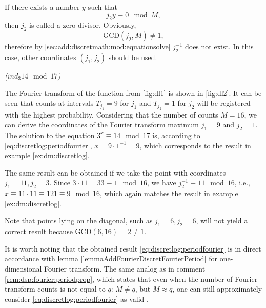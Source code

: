 \begin{remark}
If there exists a number $y$ such that 
\[
j_2 y \equiv 0 \mod M,
\]
then $j_2$ is called a zero divisor. 
Obviously, 
\[
\text{GCD}\left(j_2, M\right) \ne 1,
\]
therefore by \autoref{sec:add:discretmath:mod:equationsolve} $j_2^{-1}$ does not exist. In this case, other coordinates $(j_1, j_2)$ should be used. 
\end{remark}

\begin{example}
\emph{($ind_3{14} \mod{17}$)}


The Fourier transform of the function from \autoref{fig:dl1} is shown in \autoref{fig:dl2}. It can be seen that counts at intervals $T_{j_1} = 9$ for $j_1$ and $T_{j_2} = 1$ for $j_2$ will be registered with the highest probability. Considering that the number of counts $M=16$, we can derive the coordinates of the Fourier transform maximum $j_1 = 9$ and $j_2 = 1$. The solution to the equation $3^x \equiv 14 \mod 17$ is, according to \eqref{eq:discretlog:periodfourier}, $x = 9 \cdot 1^{-1} = 9$, which corresponds to the result in example \ref{ex:dm:discretlog}.

The same result can be obtained if we take the point with coordinates $j_1 = 11, j_2 = 3$. Since $3 \cdot 11 = 33 \equiv 1 \mod 16$, we have $j_2^{-1} \equiv 11 \mod 16$, i.e., $x \equiv 11 \cdot 11 \equiv 121 \equiv 9 \mod 16$, which again matches the result in example \ref{ex:dm:discretlog}.

Note that points lying on the diagonal, such as $j_1 = 6, j_2 = 6$, will not yield a correct result because $\text{GCD}(6,16) = 2 \ne 1$.

\label{ex:discretlog:periodfinding}
\end{example}

It is worth noting that the obtained result \eqref{eq:discretlog:periodfourier} is in direct accordance with lemma \ref{lemmaAddFourierDiscretFourierPeriod} for one-dimensional Fourier transform. The same analog as in comment \ref{rem:dsp:fourier:periodprop}, which states that even when the number of Fourier transform counts is not equal to $q$: $M \ne q$, but $M \approx q$, one can still approximately consider \eqref{eq:discretlog:periodfourier} as valid \cite{Proos:2003:SDL:2011528.2011531}.  

